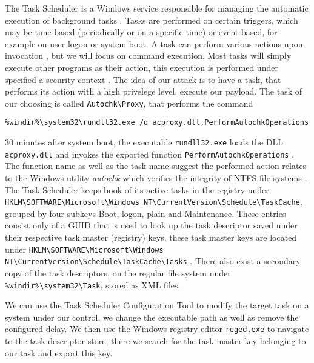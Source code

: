 
The Task Scheduler is a Windows service responsible for managing the automatic execution of background tasks \cite[10. The Task Scheduler]{windows-internals-7-part2}. Tasks are performed on certain triggers, which may be time-based (periodically or on a specific time) or event-based, for example on user logon or system boot\cite{microsoft-task-scheduler-triggers}. A task can perform various actions upon invocation \cite{microsoft-task-scheduler-actions}, but we will focus on command execution. Most tasks will simply execute other programs as their action, this execution is performed under specified a security context \cite{microsoft-task-scheduler-security-contexts}. The idea of our attack is to have a task, that performs its action with a high privelege level, execute our payload. The task of our choosing is called \lstinline{Autochk\Proxy}, that performs the command

\begin{lstlisting}
%windir%\system32\rundll32.exe /d acproxy.dll,PerformAutochkOperations
\end{lstlisting}

30 minutes after system boot, the executable \lstinline{rundll32.exe} loads the \ac{DLL} \lstinline{acproxy.dll} and invokes the exported function \lstinline{PerformAutochkOperations} \cite{microsoft-rundll32}. The function name as well as the task name suggest the performed action relates to the Windows utility \emph{autochk} which verifies the integrity of \ac{NTFS} file systems \cite{microsoft-autochk}. The Task Scheduler keeps book of its active tasks in the registry under \lstinline{HKLM\SOFTWARE\Microsoft\Windows NT\CurrentVersion\Schedule\TaskCache}, grouped by four subkeys Boot, logon, plain and Maintenance. These entries consist only of a \ac{GUID} that is used to look up the task descriptor saved under their respective task master (registry) keys, these task master keys are located under \lstinline{HKLM\SOFTWARE\Microsoft\Windows NT\CurrentVersion\Schedule\TaskCache\Tasks} \cite[10. The Task Scheduler - Initialization]{windows-internals-7-part2}. There also exist a secondary copy of the task descriptors, on the regular file system under \lstinline{%windir%\system32\Task}, stored as \ac{XML} files.

We can use the Task Scheduler Configuration Tool to modify the target task on a system under our control, we change the executable path as well as remove the configured delay. We then use the Windows registry editor \lstinline{reged.exe} to navigate to the task descriptor store, there we search for the task master key belonging to our task and export this key.

